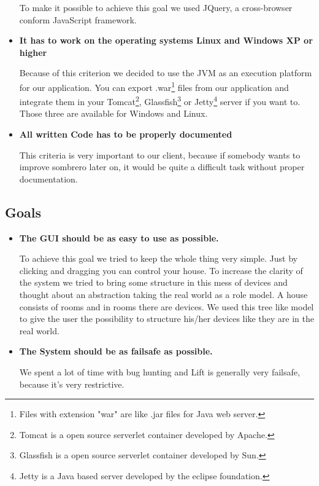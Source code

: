 \begin{itemize}
        To make it possible to achieve this goal we used JQuery, a cross-browser conform JavaScript framework.
    \item \textbf{It has to work on the operating systems Linux and Windows XP or higher}
        
        Because of this criterion we decided to use the JVM as an execution platform for our application. You can export .war\footnote[1]{Files with extension "war" are like .jar files for Java web server.} files from our application and integrate them in your Tomcat\footnote[2]{Tomcat is a open source serverlet container developed by Apache.}, Glassfish\footnote[3]{Glassfish is a open source serverlet container developed by Sun.} or Jetty\footnote[4]{Jetty is a Java based server developed by the eclipse foundation.} server if you want to. Those three are available for Windows and Linux.
    \item \textbf{All written Code has to be properly documented}
    
        This criteria is very important to our client, because if somebody wants to improve sombrero later on, it would be quite a difficult task without proper documentation.
  \end{itemize}

\subsection{Goals}
  \begin{itemize}
    \item \textbf{The GUI should be as easy to use as possible.}
    
        To achieve this goal we tried to keep the whole thing very simple. Just by clicking and dragging you can control your house. To increase the clarity of the system we tried to bring some structure in this mess of devices and thought about an abstraction taking the real world as a role model. A house consists of rooms and in rooms there are devices. We used this tree like model to give the user the possibility to structure his/her devices like they are in the real world.
    \item \textbf{The System should be as failsafe as possible.}
    
        We spent a lot of time with bug hunting and Lift is generally very failsafe, because it's very restrictive.
  \end{itemize}